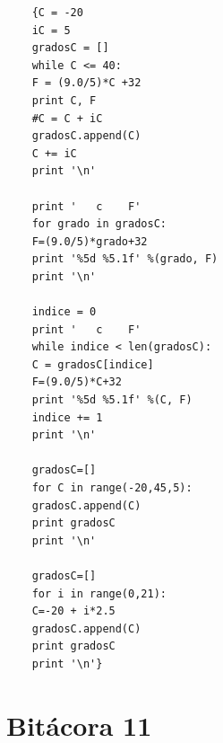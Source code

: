 \documentclass{book}
\begin{document}
	\begin{verbatim}
	{C = -20
	iC = 5
	gradosC = []
	while C <= 40:
	F = (9.0/5)*C +32
	print C, F
	#C = C + iC
	gradosC.append(C)
	C += iC
	print '\n'
	
	print '   c    F'
	for grado in gradosC:
	F=(9.0/5)*grado+32
	print '%5d %5.1f' %(grado, F)
	print '\n'
	
	indice = 0
	print '   c    F'
	while indice < len(gradosC):
	C = gradosC[indice]
	F=(9.0/5)*C+32
	print '%5d %5.1f' %(C, F)
	indice += 1
	print '\n'
	
	gradosC=[]
	for C in range(-20,45,5):
	gradosC.append(C)
	print gradosC
	print '\n'
	
	gradosC=[]
	for i in range(0,21):
	C=-20 + i*2.5
	gradosC.append(C)
	print gradosC
	print '\n'}
	\end{verbatim}
	\chapter{Bitácora 11}
\end{document}
